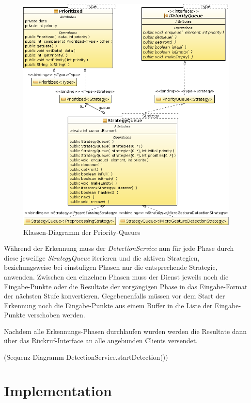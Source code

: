 \begin{figure}[h]
   \centering
   \includegraphics[width=\textwidth]{img/uml_cd_queue} 
   \caption{Klassen-Diagramm der Priority-Queues}
   \label{fig:cl_queue}
\end{figure}

Während der Erkennung muss der \emph{DetectionService} nun für jede Phase durch diese jeweilige \emph{StrategyQueue} iterieren und die aktiven Strategien, beziehungsweise bei einstufigen Phasen nur die entsprechende Strategie, anwenden. Zwischen den einzelnen Phasen muss der Dienst jeweils noch die Eingabe-Punkte oder die Resultate der vorgängigen Phase in das Eingabe-Format der nächsten Stufe konvertieren. Gegebenenfalls müssen vor dem Start der Erkennung noch die Eingabe-Punkte aus einem Buffer in die Liste der Eingabe-Punkte verschoben werden.

Nachdem alle Erkennungs-Phasen durchlaufen wurden werden die Resultate dann über das Rückruf-Interface an alle angebunden Clients versendet.

(Sequenz-Diagramm DetectionService.startDetection())


\section{Implementation}

